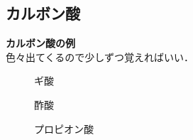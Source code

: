 \documentclass[a4paper,12pt]{ltjsreport}
\begin{document}
\subsection{カルボン酸}
\noindent \textbf{カルボン酸の例}\\
色々出てくるので少しずつ覚えればいい．\\
\begin{minipage}{0.33\linewidth}
\begin{figure}[H]
    \centering
\caption{ギ酸} 
\end{figure}
\end{minipage}
\begin{minipage}{0.33\linewidth}
\begin{figure}[H]
    \centering
\caption{酢酸} 
\end{figure}
\end{minipage}
\begin{minipage}{0.33\linewidth}
\begin{figure}[H]
    \centering
\caption{プロピオン酸} 
\end{figure}
\end{minipage}
\end{document}
